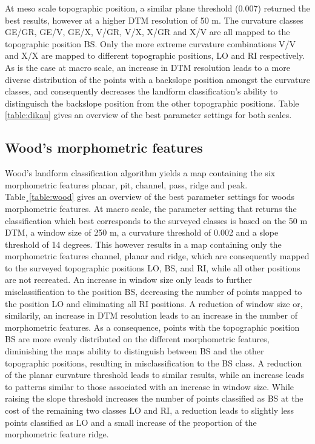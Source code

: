\documentclass[preprint,12pt,authoryear]{elsarticle}
\begin{document}
At meso scale topographic position, a similar plane threshold (0.007) returned the best results, however at a higher DTM resolution of 50 m. The curvature classes GE/GR, GE/V, GE/X, V/GR, V/X, X/GR and X/V are all mapped to the topographic position BS. Only the more extreme curvature combinations V/V and X/X are mapped to different topographic positions, LO and RI respectively. As is the case at macro scale, an increase in DTM resolution leads to a more diverse distribution of the points with a backslope position amongst the curvature classes, and consequently decreases the landform classification's ability to distinguisch the backslope position from the other topographic positions. Table \ref{table:dikau} gives an overview of the best parameter settings for both scales.

\subsection{Wood's morphometric features}
Wood's landform classification algorithm yields a map containing the six morphometric features planar, pit, channel, pass, ridge and peak. Table¸\ref{table:wood} gives an overview of the best parameter settings for woods morphometric features.
At macro scale, the parameter setting that returns the classification which best corresponds to the surveyed classes is based on the 50 m DTM, a window size of 250 m, a curvature threshold of 0.002 and a slope threshold of 14 degrees. This however results in a map containing only the morphometric features channel, planar and ridge, which are consequently mapped to the surveyed topographic positions LO, BS, and RI, while all other positions are not recreated. An increase in window size only leads to further misclassification to the position BS, decreasing the number of points mapped to the position LO and eliminating all RI positions. A reduction of window size or, similarily, an increase in DTM resolution leads to an increase in the number of morphometric features. As a consequence, points with the topographic position BS are more evenly distributed on the different morphometric features, diminishing the maps ability to distinguish between BS and the other topographic positions, resulting in misclassification to the BS class. A reduction of the planar curvature threshold leads to similar results, while an increase leads to patterns similar to those associated with an increase in window size. While raising the slope threshold increases the number of points classified as BS at the cost of the remaining two classes LO and RI, a reduction leads to slightly less points classified as LO and a small increase of the proportion of the morphometric feature ridge. 
\end{document}

